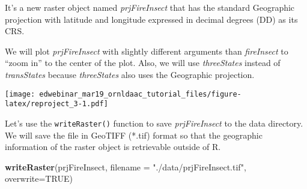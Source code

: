 \documentclass[
]{article}
\newenvironment{Shaded}{\begin{snugshade}}{\end{snugshade}}
\newcommand{\AttributeTok}[1]{\textcolor[rgb]{0.13,0.29,0.53}{#1}}
\newcommand{\ConstantTok}[1]{\textcolor[rgb]{0.56,0.35,0.01}{#1}}
\newcommand{\FloatTok}[1]{\textcolor[rgb]{0.00,0.00,0.81}{#1}}
\newcommand{\FunctionTok}[1]{\textcolor[rgb]{0.13,0.29,0.53}{\textbf{#1}}}
\newcommand{\NormalTok}[1]{#1}
\newcommand{\SpecialCharTok}[1]{\textcolor[rgb]{0.81,0.36,0.00}{\textbf{#1}}}
\newcommand{\StringTok}[1]{\textcolor[rgb]{0.31,0.60,0.02}{#1}}
\begin{document}
It's a new raster object named \emph{prjFireInsect} that has the
standard Geographic projection with latitude and longitude expressed in
decimal degrees (DD) as its CRS.

We will plot \emph{prjFireInsect} with slightly different arguments than
\emph{fireInsect} to ``zoom in'' to the center of the plot. Also, we
will use \emph{threeStates} instead of \emph{transStates} because
\emph{threeStates} also uses the Geographic projection.

\begin{Shaded}
\end{Shaded}

\texttt{[image: edwebinar\_mar19\_ornldaac\_tutorial\_files/figure-latex/reproject\_3-1.pdf]}

Let's use the \texttt{writeRaster()} function to save
\emph{prjFireInsect} to the data directory. We will save the file in
GeoTIFF (*.tif) format so that the geographic information of the raster
object is retrievable outside of R.

\begin{Shaded}
\begin{Highlighting}[]
\FunctionTok{writeRaster}\NormalTok{(prjFireInsect, }\AttributeTok{filename =} \StringTok{"./data/prjFireInsect.tif"}\NormalTok{, }\AttributeTok{overwrite=}\ConstantTok{TRUE}\NormalTok{)}
\end{Highlighting}
\end{Shaded}
\end{document}
